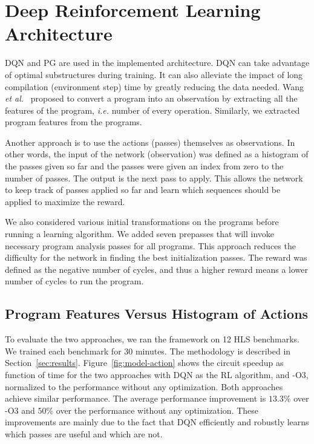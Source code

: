\section{Deep Reinforcement Learning Architecture} %
DQN and PG are used in the implemented architecture.
DQN can take advantage of optimal substructures during training. It can also alleviate the impact of long compilation (environment step) time by greatly reducing the data needed. Wang \textit{et al.}~\cite{wang2018} proposed to convert a program into an observation by extracting all the features of the program, \textit{i.e.} number of every operation. Similarly, we extracted program features from the programs. %

Another approach is to use the actions (passes) themselves as observations. In other words, the input of the network (observation) was defined as a histogram of the passes given so far and the passes were given an index from zero to the number of passes. The output is the next pass to apply. This allows the network to keep track of passes applied so far and learn which sequences should be applied to maximize the reward.

We also considered various initial transformations on the programs before running a learning algorithm. We added seven prepasses that will invoke necessary program analysis passes for all programs. This approach reduces the difficulty for the network in finding the best initialization passes. The reward was defined as the negative number of cycles, and thus a higher reward means a lower number of cycles to run the program.

\subsection{Program Features Versus Histogram of Actions}
To evaluate the two approaches, we ran the framework on 12 HLS benchmarks. We trained each benchmark for $30$ minutes. The methodology is described in Section~\ref{sec:results}. Figure~\ref{fig:model-action} shows the circuit speedup as function of time for the two approaches with DQN as the RL algorithm, and -O3, normalized to the performance without any optimization. Both approaches achieve similar performance. The average performance improvement is $13.3\%$ over -O3 and $50\%$ over the performance without any optimization. These improvements are mainly due to the fact that DQN efficiently and robustly learns which passes are useful and which are not.

